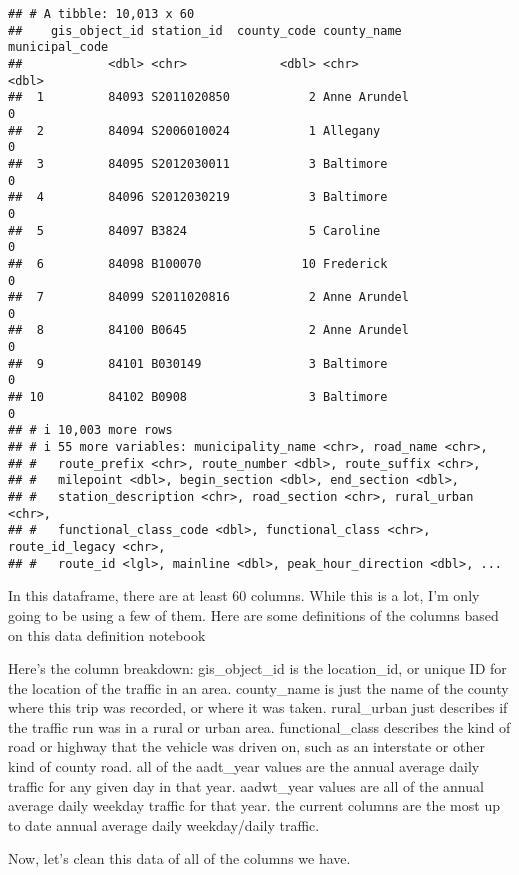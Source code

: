 \documentclass[
]{article}
\begin{document}
\begin{verbatim}
## # A tibble: 10,013 x 60
##    gis_object_id station_id  county_code county_name  municipal_code
##            <dbl> <chr>             <dbl> <chr>                 <dbl>
##  1         84093 S2011020850           2 Anne Arundel              0
##  2         84094 S2006010024           1 Allegany                  0
##  3         84095 S2012030011           3 Baltimore                 0
##  4         84096 S2012030219           3 Baltimore                 0
##  5         84097 B3824                 5 Caroline                  0
##  6         84098 B100070              10 Frederick                 0
##  7         84099 S2011020816           2 Anne Arundel              0
##  8         84100 B0645                 2 Anne Arundel              0
##  9         84101 B030149               3 Baltimore                 0
## 10         84102 B0908                 3 Baltimore                 0
## # i 10,003 more rows
## # i 55 more variables: municipality_name <chr>, road_name <chr>,
## #   route_prefix <chr>, route_number <dbl>, route_suffix <chr>,
## #   milepoint <dbl>, begin_section <dbl>, end_section <dbl>,
## #   station_description <chr>, road_section <chr>, rural_urban <chr>,
## #   functional_class_code <dbl>, functional_class <chr>, route_id_legacy <chr>,
## #   route_id <lgl>, mainline <dbl>, peak_hour_direction <dbl>, ...
\end{verbatim}

In this dataframe, there are at least 60 columns. While this is a lot,
I'm only going to be using a few of them. Here are some definitions of
the columns based on this data definition notebook

Here's the column breakdown: gis\_object\_id is the location\_id, or
unique ID for the location of the traffic in an area. county\_name is
just the name of the county where this trip was recorded, or where it
was taken. rural\_urban just describes if the traffic run was in a rural
or urban area. functional\_class describes the kind of road or highway
that the vehicle was driven on, such as an interstate or other kind of
county road. all of the aadt\_year values are the annual average daily
traffic for any given day in that year. aadwt\_year values are all of
the annual average daily weekday traffic for that year. the current
columns are the most up to date annual average daily weekday/daily
traffic.

Now, let's clean this data of all of the columns we have.
\end{document}
